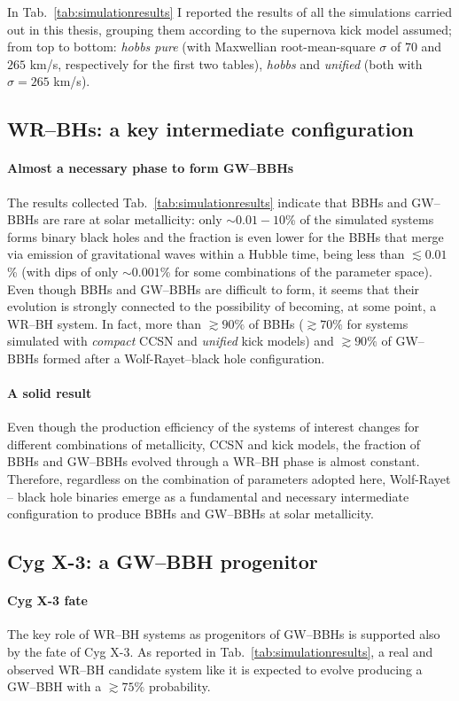 \documentclass[a4paper,titlepage]{book}     	%
\begin{document}
In Tab.\ \ref{tab:simulationresults} I reported the results of all the simulations carried out in this thesis, grouping them according to the supernova kick model assumed; from top to bottom: \emph{hobbs pure} (with Maxwellian root-mean-square $\sigma$ of $70$ and $265$ km/s, respectively for the first two tables), \emph{hobbs} and \emph{unified} (both with $\sigma=265$ km/s).

\subsection{WR--BHs: a key intermediate configuration} 
\paragraph{Almost a necessary phase to form GW--BBHs} The results collected Tab.\ \ref{tab:simulationresults} indicate that BBHs and GW--BBHs are rare at solar metallicity: only $\sim 0.01 - 10$\% of the simulated systems forms binary black holes and the fraction is even lower for the BBHs that merge via emission of gravitational waves within a Hubble time, being less than $\lesssim 0.01$\% (with dips of only $\sim 0.001$\% for some combinations of the parameter space). Even though BBHs and GW--BBHs are difficult to form, it seems that their evolution is strongly connected to the possibility of becoming, at some point, a WR--BH system. In fact, more than $\gtrsim 90\%$ of BBHs ($\gtrsim 70\%$ for systems simulated with \emph{compact} CCSN and \emph{unified} kick models) and $\gtrsim 90\%$ of GW--BBHs formed after a Wolf-Rayet--black hole configuration. 

\paragraph{A solid result} Even though the production efficiency of the systems of interest changes for different combinations of metallicity, CCSN and kick models, the fraction of BBHs and GW--BBHs evolved through a WR--BH phase is almost constant. Therefore, regardless on the combination of parameters adopted here, Wolf-Rayet -- black hole binaries emerge as a fundamental and necessary intermediate configuration to produce BBHs and GW--BBHs at solar metallicity.

\subsection{Cyg X-3: a GW--BBH progenitor}
\paragraph{Cyg X-3 fate} The key role of WR--BH systems as progenitors of GW--BBHs is supported also by the fate of Cyg X-3. As reported in Tab.\ \ref{tab:simulationresults}, a real and observed WR--BH candidate system like it is expected to evolve producing a GW--BBH with a $\gtrsim 75 \%$ probability. 
\end{document}
